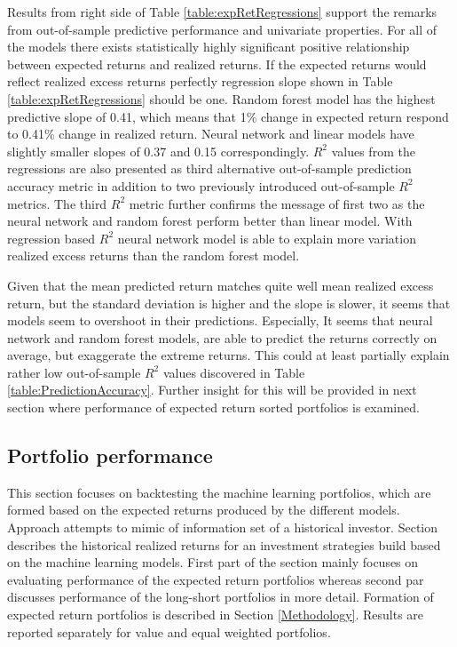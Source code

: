 \documentclass[12pt]{article}
\begin{document}
Results from right side of Table \ref{table:expRetRegressions} support the remarks from out-of-sample predictive performance and univariate properties. For all of the models there exists statistically highly significant positive relationship between expected returns and realized returns. If the expected returns would reflect realized excess returns perfectly regression slope shown in Table \ref{table:expRetRegressions} should be one. Random forest model has the highest predictive slope of 0.41, which means that 1\% change in expected return respond to 0.41\% change in realized return. Neural network and linear models have slightly smaller slopes of 0.37 and 0.15 correspondingly. $R^2$ values from the regressions are also presented as third alternative out-of-sample prediction accuracy metric in addition to two previously introduced out-of-sample $R^2$ metrics. The third $R^2$ metric further confirms the message of first two as the neural network and random forest perform better than linear model. With regression based $R^2$ neural network model is able to explain more variation realized excess returns than the random forest model. \par

Given that the mean predicted return matches quite well mean realized excess return, but the standard deviation is higher and the slope is slower, it seems that models seem to overshoot in their predictions. Especially, It seems that neural network and random forest models, are able to predict the returns correctly on average, but exaggerate the extreme returns. This could at least partially explain rather low out-of-sample $R^2$ values discovered in Table \ref{table:PredictionAccuracy}. Further insight for this will be provided in next section where performance of expected return sorted portfolios is examined. \par

\subsection{Portfolio performance}\label{PortfolioPerformance}

This section focuses on backtesting the machine learning portfolios, which are formed based on the expected returns produced by the different models. Approach attempts to mimic of information set of a historical investor. Section describes the historical realized returns for an investment strategies build based on the machine learning models. First part of the section mainly focuses on evaluating performance of the expected return portfolios whereas second par discusses performance of the long-short portfolios in more detail. Formation of expected return portfolios is described in Section \ref{Methodology}. Results are reported separately for value and equal weighted portfolios. \par
\end{document}
